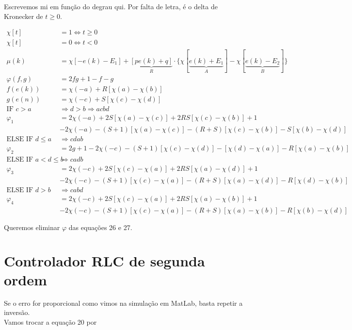 \documentclass[12pt]{article}
\begin{document}
Escrevemos mi em fun\c{c}\~ao do degrau qui. Por falta de letra, \'e o delta de Kronecker de $t \ge 0$.

\begin{align}
  \chi[t] &= 1 \Leftrightarrow t \ge 0 \\
  \chi[t] &= 0 \Leftrightarrow t < 0 \\
  \mu(k) &= \chi[-e(k) - E_1] + \underbrace{[pe(k) + q]}_R\cdot \{ \chi[\underbrace{e(k) + E_1}_A] - \chi[\underbrace{e(k) - E_2}_B] \} \\
  \varphi(f, g) &= 2fg + 1 - f - g \\
  f(e(k)) &= \chi(-a) + R[\chi(a) - \chi(b)] \\
  g(e(n)) &= \chi(-c) + S[\chi(c) - \chi(d)] \\
  \text{IF }c > a &\Rightarrow d> b \Rightarrow acbd \\
  \varphi_1 &= 2 \chi(-a) + 2 S [\chi(a) - \chi(c)] + 2 RS [\chi(c) - \chi(b)] + 1 \\
&- 2 \chi(-a) - (S + 1) [\chi(a) - \chi(c)] - (R + S) [\chi(c) - \chi(b)] - S [\chi(b) - \chi(d)] \\
  \text{ELSE IF }d \le a &\Rightarrow cdab \\
    \varphi_2 &= 2g + 1 - 2 \chi(-c) - (S + 1) [\chi(c) - \chi(d)] - [\chi(d) - \chi(a)] - R [\chi(a) - \chi(b)] \\
  \text{ELSE IF }a < d \le b &\Rightarrow cadb \\
    \varphi_3 &= 2 \chi(-c) + 2 S [\chi(c) - \chi(a)] + 2 RS [\chi(a) - \chi(d)] + 1 \\
&- 2 \chi(-c) - (S + 1) [\chi(c) - \chi(a)] - (R + S) [\chi(a) - \chi(d)] - R [\chi(d) - \chi(b)] \\
  \text{ELSE IF }d > b &\Rightarrow cabd\\
  \varphi_4 &= 2 \chi(-c) + 2 S [\chi(c) - \chi(a)] + 2 RS [\chi(a) - \chi(b)] + 1\\
&- 2 \chi(-c) - (S + 1) [\chi(c) - \chi(a)] - (R + S) [\chi(a) - \chi(b)] - R [\chi(b) - \chi(d)]
\end{align}

Queremos eliminar $\varphi$ das equa\c{c}\~oes 26 e 27.

\section{Controlador RLC de segunda ordem}

\begin{flushleft}
Se o erro for proporcional como vimos na simula\c{c}\~ao em MatLab, basta repetir a invers\~ao. \\
Vamos trocar a equa\c{c}\~ao 20 por
\end{flushleft}
\end{document}

